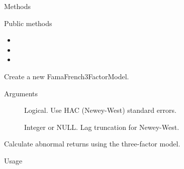 \documentclass[a4paper]{book}
\begin{document}
\begin{Section}{Methods}
%
\begin{SubSection}{Public methods}
\begin{itemize}

\item{} 
\item{} 
\item{} 

\end{itemize}

\end{SubSection}




\hypertarget{method-FamaFrench3FactorModel-initialize}{}
%
\begin{SubSection}{}
Create a new FamaFrench3FactorModel.
%

%
\begin{SubSubSection}{Arguments}

\begin{description}

\item[] Logical. Use HAC (Newey-West) standard errors.
\item[] Integer or NULL. Lag truncation for Newey-West.

\end{description}



\end{SubSubSection}

\end{SubSection}




\hypertarget{method-FamaFrench3FactorModel-abnormal_returns}{}
%
\begin{SubSection}{}
Calculate abnormal returns using the three-factor model.
%
\begin{SubSubSection}{Usage}


\end{SubSubSection}
\end{SubSection}
\end{Section}
\end{document}
